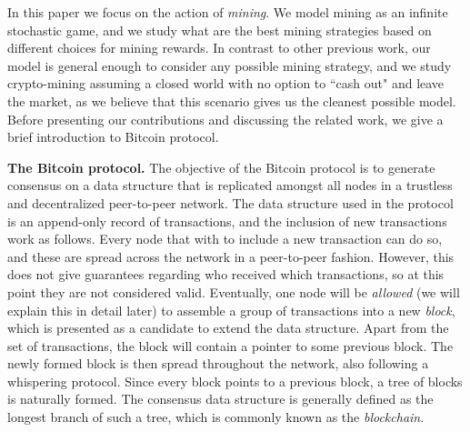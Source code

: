 In this paper we focus on the action of \emph{mining}. We model mining as an infinite stochastic game, and we study what are the best mining strategies based on 
different choices for mining rewards. In contrast to other previous work, our model is general enough to consider any possible mining strategy, and 
we study crypto-mining assuming a closed world with no option to ``cash out" and leave the market, as we believe that this scenario gives us the cleanest possible model.  
Before presenting our contributions and discussing the related work, we give a brief introduction to Bitcoin protocol. %

\smallskip
\noindent
{\bf The Bitcoin protocol.} The objective of the Bitcoin protocol is to generate consensus on a data structure that is replicated amongst all nodes in a trustless 
and decentralized peer-to-peer network. The data structure used in the protocol is an append-only record of transactions, and the inclusion of new transactions work as follows. 
Every node that with to include a new transaction can do so, and these are spread across the network in a peer-to-peer fashion. However, this does not give guarantees 
regarding who received which transactions, so at this point they are not considered valid. Eventually, one node will be \emph{allowed} (we will explain this in detail later) to assemble a group of transactions into a new \emph{block}, which is presented as a candidate to extend the data structure. Apart from the set of transactions, the block will contain a pointer to some previous block. The newly formed block is then spread throughout the network, also following a whispering protocol. Since every block points to a previous block, a tree of blocks is naturally formed. The consensus data structure is generally defined as the longest branch of such a tree, which is commonly known as the \emph{blockchain}.

